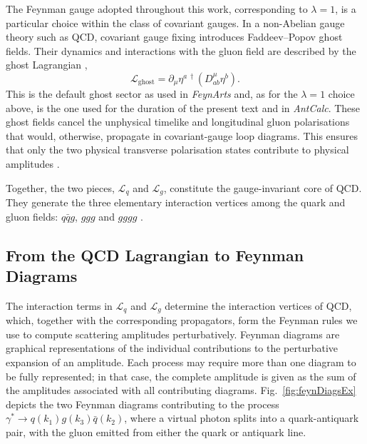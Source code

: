 The Feynman gauge adopted throughout this work, corresponding
to $\lambda=1$, is a particular choice within the class of covariant gauges. In a
non-Abelian gauge theory such as QCD, covariant gauge fixing introduces
Faddeev--Popov ghost fields. Their dynamics and interactions with the gluon field
are described by the ghost Lagrangian \cite{Ellis:1996mzs},
\begin{equation}\label{eq:ghostLagrangian}
    \mathcal L_\text{ghost}=\partial_\mu\eta^{a\,\dagger}\!\left(D_{ab}^\mu\eta^b\right).
\end{equation}
This is the default ghost sector as used in \textit{FeynArts} \cite{Hahn:2000kx} and, as for the
$\lambda=1$ choice above, is the one used for the duration of the present text and
in \textit{AntCalc}. These ghost fields cancel the unphysical timelike and longitudinal 
gluon polarisations that would, otherwise, propagate in covariant-gauge loop 
diagrams. This ensures that only the two physical transverse 
polarisation states contribute to physical amplitudes \cite{Ellis:1996mzs}.

Together, the two pieces, $\mathcal L_q$ and $\mathcal L_g$, constitute the 
gauge-invariant core of QCD. They generate the three elementary interaction vertices 
among the quark and gluon fields: $q\bar qg$, $ggg$ and $gggg$ \cite{Ellis:1996mzs,Schwartz:2014sze}.

\subsection{From the QCD Lagrangian to Feynman Diagrams}\label{subsec:toFeynDiag}

The interaction terms in $\mathcal L_q$ and $\mathcal L_g$ determine the interaction
vertices of QCD, which, together with the corresponding propagators, form the Feynman
rules we use to compute scattering amplitudes perturbatively. Feynman diagrams are
graphical representations of the individual contributions to the perturbative
expansion of an amplitude. Each process may require more than one diagram to be
fully represented; in that case,
the complete amplitude is given as the sum of the amplitudes associated with all 
contributing diagrams. Fig.~\ref{fig:feynDiagsEx} depicts the two Feynman diagrams 
contributing to the process $\gamma^*\to q(k_1)g(k_3)\bar q(k_2)$, where a virtual 
photon splits into a quark-antiquark pair, with the gluon emitted from either the 
quark or antiquark line. 

